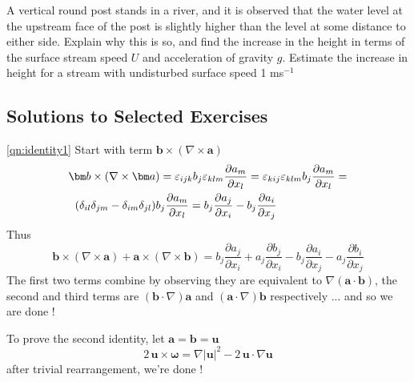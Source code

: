 \documentclass[10pt]{report}
\begin{document}
\begin{questionstar}
	A vertical round post stands in a river, and it is observed that the
	water level at the upstream face of the post is slightly higher than the
	level at some distance to either side. Explain why this is so, and find the
	increase in the height in terms of the surface stream speed $U$ and
	acceleration of gravity $g$. Estimate the increase in height for a stream with
	undisturbed surface speed 1 ms$^{-1}$
	\label{qn:submergedpost}
\end{questionstar}




\begin{answer3}

\newpage

\section{Solutions to Selected Exercises}

\begin{questionnumber}{\ref{qn:identity1}}
Start with term ${\bm b}\times(\nabla \times {\bm a})$
\begin{multline*}
   {\bm b}\times(\nabla \times {\bm a}) =
    \varepsilon_{ijk} b_{j} \varepsilon_{klm} \frac{\partial a_{m}}{\partial x_{l}} =
    \varepsilon_{kij} \varepsilon_{klm} b_{j} \frac{\partial a_{m}}{\partial x_{l}} = \\
    (\delta_{il}\delta_{jm} - \delta_{im}\delta_{jl}) b_{j}
    			\frac{\partial a_{m}}{\partial x_{l}} =
	 b_{j} \frac{\partial a_{j}}{\partial x_{i}}	 - b_{j} \frac{\partial a_{i}}{\partial x_{j}} \mbox{\hspace*{2cm}}
\end{multline*}
Thus
\[
   {\bm b}\times(\nabla \times {\bm a}) + {\bm a}\times(\nabla \times {\bm b}) =
 b_{j} \frac{\partial a_{j}}{\partial x_{i}}	+ a_{j} \frac{\partial b_{j}}{\partial x_{i}}
 - b_{j} \frac{\partial a_{i}}{\partial x_{j}} - a_{j} \frac{\partial b_{i}}{\partial x_{j}}
\]
The first two terms combine by observing they are equivalent to $\nabla ({\bm a} \cdot {\bm b})$, the second and third terms are $({\bm b} \cdot \nabla) {\bm a}$ and  $({\bm a} \cdot \nabla) {\bm b}$ respectively ... and so we are done !

To prove the second identity, let ${\bm a} = {\bm b} = {\bm u}$
\[
   2\, {\bm u} \times {\bm \omega} = \nabla |{\bm u}|^{2} - 2\, {\bm u} \cdot \nabla {\bm u}
\]
after trivial rearrangement, we're done !
\end{questionnumber}


\end{answer3}
\end{document}
